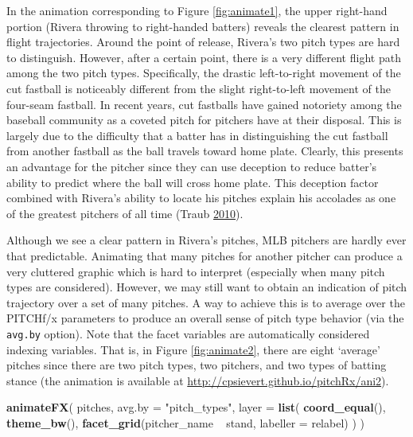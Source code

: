 \documentclass[12pt,]{isuthesis}
\newenvironment{Shaded}{\begin{snugshade}}{\end{snugshade}}
\newcommand{\KeywordTok}[1]{\textcolor[rgb]{0.13,0.29,0.53}{\textbf{{#1}}}}
\newcommand{\DataTypeTok}[1]{\textcolor[rgb]{0.13,0.29,0.53}{{#1}}}
\newcommand{\StringTok}[1]{\textcolor[rgb]{0.31,0.60,0.02}{{#1}}}
\newcommand{\NormalTok}[1]{{#1}}
\begin{document}
In the animation corresponding to Figure \ref{fig:animate1}, the upper
right-hand portion (Rivera throwing to right-handed batters) reveals the
clearest pattern in flight trajectories. Around the point of release,
Rivera's two pitch types are hard to distinguish. However, after a
certain point, there is a very different flight path among the two pitch
types. Specifically, the drastic left-to-right movement of the cut
fastball is noticeably different from the slight right-to-left movement
of the four-seam fastball. In recent years, cut fastballs have gained
notoriety among the baseball community as a coveted pitch for pitchers
have at their disposal. This is largely due to the difficulty that a
batter has in distinguishing the cut fastball from another fastball as
the ball travels toward home plate. Clearly, this presents an advantage
for the pitcher since they can use deception to reduce batter's ability
to predict where the ball will cross home plate. This deception factor
combined with Rivera's ability to locate his pitches explain his
accolades as one of the greatest pitchers of all time (Traub
\protect\hyperlink{ref-NYT}{2010}).

Although we see a clear pattern in Rivera's pitches, MLB pitchers are
hardly ever that predictable. Animating that many pitches for another
pitcher can produce a very cluttered graphic which is hard to interpret
(especially when many pitch types are considered). However, we may still
want to obtain an indication of pitch trajectory over a set of many
pitches. A way to achieve this is to average over the PITCHf/x
parameters to produce an overall sense of pitch type behavior (via the
\texttt{avg.by} option). Note that the facet variables are automatically
considered indexing variables. That is, in Figure \ref{fig:animate2},
there are eight `average' pitches since there are two pitch types, two
pitchers, and two types of batting stance (the animation is available at
\url{http://cpsievert.github.io/pitchRx/ani2}).

\begin{Shaded}
\begin{Highlighting}[]
\KeywordTok{animateFX}\NormalTok{(}
  \NormalTok{pitches, }\DataTypeTok{avg.by =} \StringTok{"pitch_types"}\NormalTok{, }
  \DataTypeTok{layer =} \KeywordTok{list}\NormalTok{(}
    \KeywordTok{coord_equal}\NormalTok{(), }\KeywordTok{theme_bw}\NormalTok{(), }
    \KeywordTok{facet_grid}\NormalTok{(pitcher_name ~}\StringTok{ }\NormalTok{stand, }\DataTypeTok{labeller =} \NormalTok{relabel)}
  \NormalTok{)}
\NormalTok{)}
\end{Highlighting}
\end{Shaded}
\end{document}
